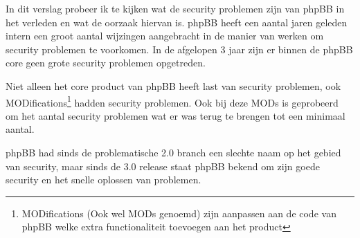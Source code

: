 In dit verslag probeer ik te kijken wat de security problemen zijn van phpBB in het verleden en wat de oorzaak hiervan is. phpBB heeft een aantal jaren geleden intern een groot aantal wijzingen aangebracht in de manier van werken om security problemen te voorkomen. In de afgelopen 3 jaar zijn er binnen de phpBB core geen grote security problemen opgetreden\cite{bib.phpbb.secunia}.

Niet alleen het core product van phpBB heeft last van security problemen, ook MODifications\footnote{MODifications (Ook wel MODs genoemd) zijn aanpassen aan de code van phpBB welke extra functionaliteit toevoegen aan het product} hadden security problemen. Ook bij deze MODs is geprobeerd om het aantal security problemen wat er was terug te brengen tot een minimaal aantal.

phpBB had sinds de problematische 2.0 branch een slechte naam op het gebied van security, maar sinds de 3.0 release staat phpBB bekend om zijn goede security en het snelle oplossen van problemen.
